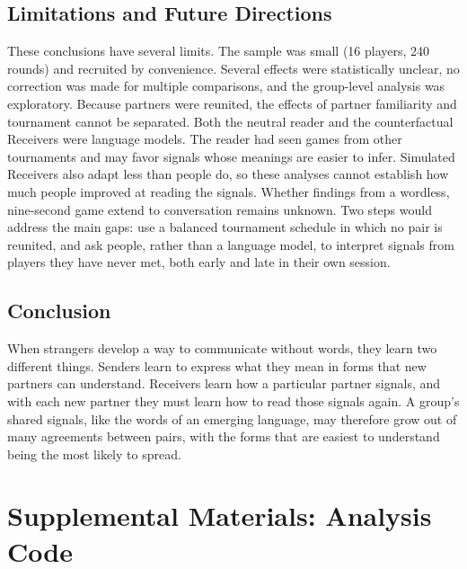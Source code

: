 \documentclass[stu,11pt,floatsintext,donotrepeattitle]{apa7}
\begin{document}
\subsection{Limitations and Future Directions}

These conclusions have several limits. The sample was small (16 players, 240 rounds) and recruited by convenience. Several effects were statistically unclear, no correction was made for multiple comparisons, and the group-level analysis was exploratory. Because partners were reunited, the effects of partner familiarity and tournament cannot be separated. Both the neutral reader and the counterfactual Receivers were language models. The reader had seen games from other tournaments and may favor signals whose meanings are easier to infer. Simulated Receivers also adapt less than people do, so these analyses cannot establish how much people improved at reading the signals. Whether findings from a wordless, nine-second game extend to conversation remains unknown. Two steps would address the main gaps: use a balanced tournament schedule in which no pair is reunited, and ask people, rather than a language model, to interpret signals from players they have never met, both early and late in their own session.

\subsection{Conclusion}

When strangers develop a way to communicate without words, they learn two different things. Senders learn to express what they mean in forms that new partners can understand. Receivers learn how a particular partner signals, and with each new partner they must learn how to read those signals again. A group's shared signals, like the words of an emerging language, may therefore grow out of many agreements between pairs, with the forms that are easiest to understand being the most likely to spread.

\printbibliography

\appendix
\section{Supplemental Materials: Analysis Code}
\end{document}
